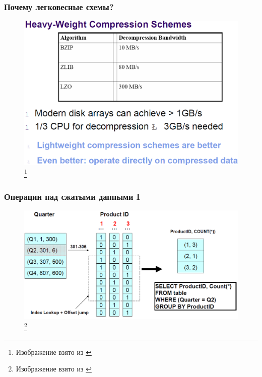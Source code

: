 \documentclass{beamer}
\begin{document}
\begin{frame}
\frametitle{Почему легковесные схемы?}

\begin{figure}[htb]
\includegraphics[width=\textwidth,height=0.75\textheight,keepaspectratio]{compression7.png} 
\footnote{\tiny{Изображение взято из \cite{Harizopoulos2009}}}
 \end{figure}    

\end{frame}

\begin{frame}
\frametitle{Операции над сжатыми данными I}

\begin{figure}[htb]
\includegraphics[width=\textwidth,height=0.75\textheight,keepaspectratio]{compression8.png} 
\footnote{\tiny{Изображение взято из \cite{Harizopoulos2009}}}
 \end{figure}    

\end{frame}
\end{document}
